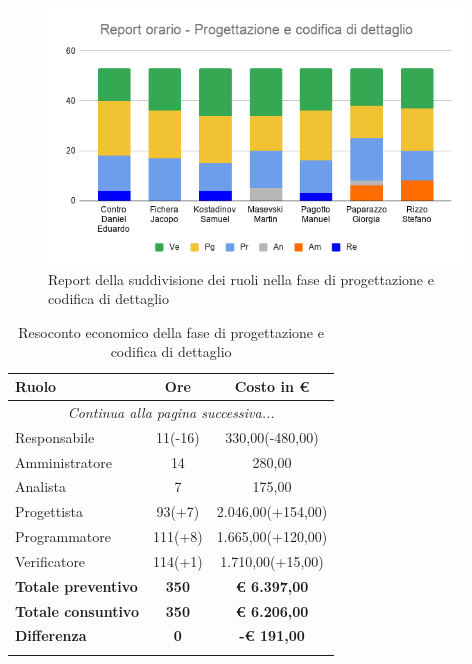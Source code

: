 \documentclass[../piano_di_progetto.tex]{subfiles}
\begin{document}
\begin{figure}[H]
	\centering
	\includegraphics[width=11cm]{src/img/report/report_prog_codifica_dettaglio_consuntivo}
	\caption{Report della suddivisione dei ruoli nella fase di progettazione e codifica di dettaglio}
\end{figure}

\begin{center}
	\begin{longtable}{|l|c|c|}
		\hline
		\rowcolor{lightgray}
		\textbf{Ruolo} & \textbf{Ore} & \textbf{Costo in €}\\
		\hline
		\endhead
		
		\hline
		\multicolumn{3}{|c|}{\emph{Continua alla pagina successiva...}}\\
		\hline
		\endfoot

		\endlastfoot
		Responsabile & 	 11(-16) 	 & 330,00(-480,00) \\
		Amministratore & 14 	 & 280,00 \\
		Analista & 		7 	 & 175,00 \\
		Progettista &    93(+7)   & 2.046,00(+154,00) \\
		Programmatore &  111(+8)   & 1.665,00(+120,00) \\
		Verificatore &   114(+1)  & 1.710,00(+15,00) \\
		\hline
		\textbf{Totale preventivo} & \textbf{350} & \textbf{€ 6.397,00} \\
		\hline
		\textbf{Totale consuntivo} & \textbf{350} & \textbf{€ 6.206,00} \\
		\hline
		\textbf{Differenza} & \textbf{0} & \textbf{-€ 191,00}\\
		\hline
		\rowcolor{white}
		\caption{Resoconto economico della fase di progettazione e codifica di dettaglio}
	\end{longtable}
\end{center}
\end{document}
